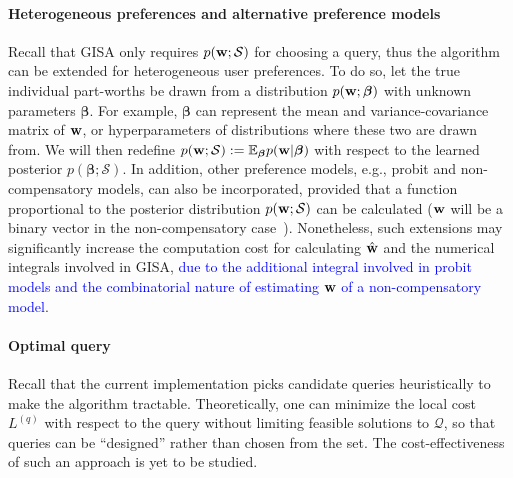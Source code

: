 \documentclass[onecolumn,11pt]{article}
\newcommand{\highlight}[1]{{\textcolor{blue}{{#1}}}}
\newcommand{\highlight}[1]{{{#1}}}
\begin{document}
\paragraph{Heterogeneous preferences and alternative preference models}
\label{subsec:relaxw}
Recall that GISA only requires $p({\bf w};\mathcal{S})$ for choosing a query, thus the algorithm can be extended for heterogeneous user preferences. To do so, let the true individual part-worths be drawn from a distribution $p({\bf w};\boldsymbol{\beta})$ with unknown parameters $\boldsymbol{\beta}$. For example, $\boldsymbol{\beta}$ can represent the mean and variance-covariance matrix of ${\bf w}$, or hyperparameters of distributions where these two are drawn from. We will then redefine $p({\bf w};\mathcal{S}):= \mathbb{E}_{\boldsymbol{\beta}}p({\bf w}|\boldsymbol{\beta})$ with respect to the learned posterior $p(\boldsymbol{\beta};\mathcal{S})$. In addition, other preference models, e.g., probit and non-compensatory models, can also be incorporated, provided that a function proportional to the posterior distribution $p({\bf w};\mathcal{S})$ can be calculated (${\bf w}$ will be a binary vector in the non-compensatory case~\cite{hauser2010disjunctions}). Nonetheless, such extensions may significantly increase the computation cost for calculating $\hat{\bf w}$ and the numerical integrals involved in GISA, \highlight{due to the additional integral involved in probit models and the combinatorial nature of estimating ${\bf w}$ of a non-compensatory model}.   

\paragraph{Optimal query}
\label{subsec:optquery}
Recall that the current implementation picks candidate queries heuristically to make the algorithm tractable. Theoretically, one can minimize the local cost $L^{(q)}$ with respect to the query without limiting feasible solutions to $\mathcal{Q}$, so that queries can be ``designed'' rather than chosen from the set. The cost-effectiveness of such an approach is yet to be studied.
\end{document}
